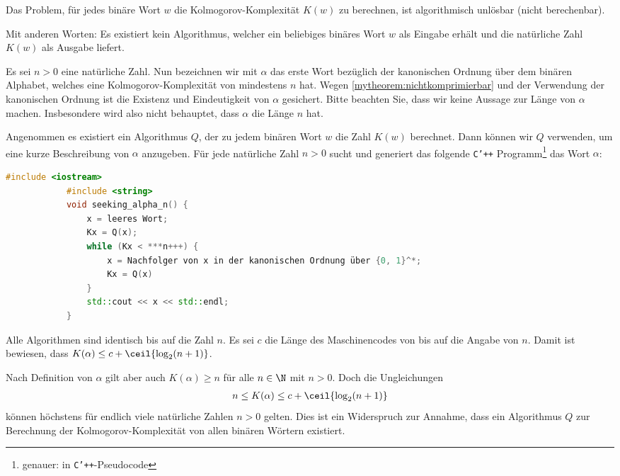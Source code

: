 \begin{mytheorem}\label{mytheorem:Knotcomputable}
	Das Problem, für jedes binäre Wort $w$ die Kolmogorov-Komplexität $K(w)$ zu berechnen, ist algorithmisch unlösbar (nicht berechenbar).

	\vspace{\baselineskip}
	Mit anderen Worten: Es existiert kein Algorithmus, welcher ein beliebiges binäres Wort $w$ als Eingabe erhält und die natürliche Zahl $K(w)$ als Ausgabe liefert.
	\begin{myproof}
		Es sei $n>0$ eine natürliche Zahl. Nun bezeichnen wir mit $\alpha$ das erste Wort bezüglich der kanonischen Ordnung über dem binären Alphabet, welches eine Kolmogorov-Komplexität von mindestens $n$ hat.
		Wegen \cref{mytheorem:nichtkomprimierbar} und der Verwendung der kanonischen Ordnung ist die Existenz und Eindeutigkeit von $\alpha$ gesichert.
		Bitte beachten Sie, dass wir keine Aussage zur Länge von $\alpha$ machen. Insbesondere wird also nicht behauptet, dass $\alpha$ die Länge $n$ hat.

		\vspace{\baselineskip}
		Angenommen es existiert ein Algorithmus $Q$, der zu jedem binären Wort $w$ die Zahl $K(w)$ berechnet. Dann können wir $Q$ verwenden, um eine kurze Beschreibung von $\alpha$ anzugeben. Für jede natürliche Zahl $n>0$ sucht und generiert das folgende \texttt{C'++} Programm\footnote{genauer: in \texttt{C'++}-Pseudocode} das Wort $\alpha$:
		\begin{lstlisting}[language=C++]
			#include <iostream>
			#include <string>
			void seeking_alpha_n() {
				x = leeres Wort;
				Kx = Q(x);
				while (Kx < ***n+++) {
					x = Nachfolger von x in der kanonischen Ordnung über {0, 1}^*;
					Kx = Q(x)
				}
				std::cout << x << std::endl;
			}
        \end{lstlisting}
		Alle Algorithmen  sind identisch bis auf die Zahl $n$. Es sei $c$ die Länge des Maschinencodes von  bis auf die Angabe von $n$. Damit ist bewiesen, dass $K(\alpha) \leq c + \ceil{\log_2(n+1)}$.

		\vspace{\baselineskip}
		Nach Definition von $\alpha$ gilt aber auch $K(\alpha) \geq n$ für alle $n\in\N$ mit $n>0$. Doch die Ungleichungen
		\begin{align*}
			n \leq K(\alpha) \leq c + \ceil{\log_2(n+1)}
		\end{align*}
		können höchstens für endlich viele natürliche Zahlen $n>0$ gelten. Dies ist ein Widerspruch zur Annahme, dass ein Algorithmus $Q$ zur Berechnung der Kolmogorov-Komplexität von allen binären Wörtern existiert.
	\end{myproof}
\end{mytheorem}

